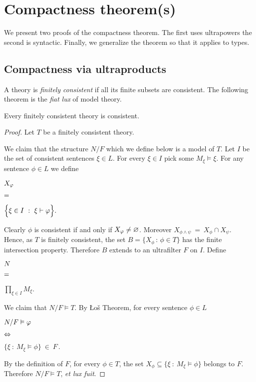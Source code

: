 \chapter{Compactness theorem(s)}
\label{compactness}

\def\medrel#1{\parbox[t]{6ex}{$\displaystyle\hfil #1$}}
\def\ceq#1#2#3{\parbox{20ex}{$\displaystyle #1$}\medrel{#2}$\displaystyle  #3$}

We present two proofs of the compactness theorem.
The first uses ultrapowers the second is syntactic.
Finally, we generalize the theorem so that it applies to types.

\section{Compactness via ultraproducts}\label{compactness_Ultra}
\def\medrel#1{\parbox[t]{6ex}{$\displaystyle\hfil #1$}}
\def\ceq#1#2#3{\parbox{25ex}{$\displaystyle #1$}\medrel{#2}$\displaystyle  #3$}

A theory is \emph{finitely consistent\/} if all its finite subsets are consistent.
The following theorem is the \textit{fiat lux\/} of model theory. 

\begin{void}\label{thmcompattezza}
Every finitely consistent theory is consistent. 
\end{void}

\begin{proof}
Let  $T$ be a finitely consistent theory. 

We claim that the structure $N/F$ which we define below is a model of $T$. Let $I$ be the set of consistent sentences $\xi\in L$.
For every $\xi\in I$ pick some $M_\xi\models\xi$.
For any sentence $\phi\in L$ we define

\ceq{\hfill X_\phi}{=}{\Big\{\xi\in I\ :\ \xi\proves \phi\Big\}.}

Clearly $\phi$ is consistent if and only if $X_\varphi\neq\varnothing$.
Moreover $X_{\phi\wedge\psi}\ =\ X_\phi\cap X_\psi$.
Hence, as $T$ is finitely consistent, the set $B=\big\{X_\phi\,:\,\phi\in T\big\}$ has the finite intersection property. Therefore $B$ extends to an ultrafilter $F$ on $I$. Define

\ceq{\hfill N}{=}{\prod_{\xi\in I}M_\xi}.

We claim that $N/F\models T$. By \L o\v{s} Theorem, for every sentence $\phi\in L$

\ceq{\hfill N/F\models \phi}%
{\IFF}%
{\Big\{\xi\ :\ M_\xi\models\phi\Big\}\ \in\ F\,.}

By the definition of $F$, for every $\phi\in T$, the set $X_\phi\subseteq \big\{\xi\ :\ M_\xi\models \phi\big\}$ belongs to $F$. Therefore $N/F\models T$, \textit{et lux fuit}.
\end{proof}


